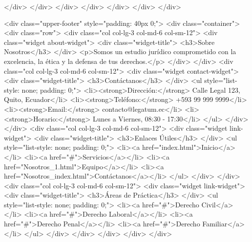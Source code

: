                             </div>
                        </div>
                    </div>
                </div>
            </div>
        </div>
    </div>

    <div class="upper-footer" style="padding: 40px 0;">
        <div class="container">
            <div class="row">
                <div class="col col-lg-3 col-md-6 col-sm-12">
                    <div class="widget about-widget">
                        <div class="widget-title">
                            <h3>Sobre Nosotros</h3>
                        </div>
                        <p>Somos un estudio jurídico comprometido con la excelencia, la ética y la defensa de tus derechos.</p>
                    </div>
                </div>
                <div class="col col-lg-3 col-md-6 col-sm-12">
                    <div class="widget contact-widget">
                        <div class="widget-title">
                            <h3>Contáctanos</h3>
                        </div>
                        <ul style="list-style: none; padding: 0;">
                            <li><strong>Dirección:</strong> Calle Legal 123, Quito, Ecuador</li>
                            <li><strong>Teléfono:</strong> +593 99 999 9999</li>
                            <li><strong>Email:</strong> contacto@legatum.ec</li>
                            <li><strong>Horario:</strong> Lunes a Viernes, 08:30 - 17:30</li>
                        </ul>
                    </div>
                </div>
                <div class="col col-lg-3 col-md-6 col-sm-12">
                    <div class="widget link-widget">
                        <div class="widget-title">
                            <h3>Enlaces Útiles</h3>
                        </div>
                        <ul style="list-style: none; padding: 0;">
                            <li><a href="index.html">Inicio</a></li>
                            <li><a href="#">Servicios</a></li>
                            <li><a href="Nosotros_1.html">Equipo</a></li>
                            <li><a href="Nosotros_index.html">Contáctanos</a></li>
                        </ul>
                    </div>
                </div>
                <div class="col col-lg-3 col-md-6 col-sm-12">
                    <div class="widget link-widget">
                        <div class="widget-title">
                            <h3>Áreas de Práctica</h3>
                        </div>
                        <ul style="list-style: none; padding: 0;">
                            <li><a href="#">Derecho Civil</a></li>
                            <li><a href="#">Derecho Laboral</a></li>
                            <li><a href="#">Derecho Penal</a></li>
                            <li><a href="#">Derecho Familiar</a></li>
                        </ul>
                    </div>
                </div>
            </div>
        </div>
    </div>

